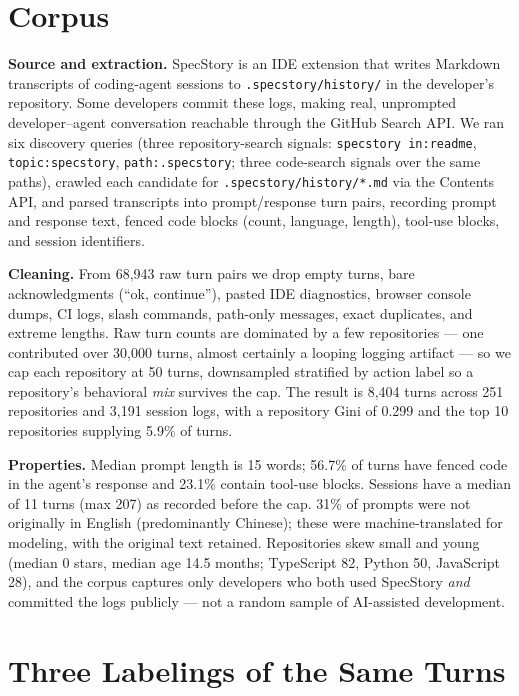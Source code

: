 \documentclass[10pt]{article}
\begin{document}
\section{Corpus}

\textbf{Source and extraction.} SpecStory is an IDE extension that writes
Markdown transcripts of coding-agent sessions to \texttt{.specstory/history/} in
the developer's repository. Some developers commit these logs, making real,
unprompted developer--agent conversation reachable through the GitHub Search API.
We ran six discovery queries (three repository-search signals: \texttt{specstory
in:readme}, \texttt{topic:specstory}, \texttt{path:.specstory}; three code-search
signals over the same paths), crawled each candidate for
\texttt{.specstory/history/*.md} via the Contents API, and parsed transcripts
into prompt/response turn pairs, recording prompt and response text, fenced code
blocks (count, language, length), tool-use blocks, and session identifiers.

\textbf{Cleaning.} From 68{,}943 raw turn pairs we drop empty turns, bare
acknowledgments (``ok, continue''), pasted IDE diagnostics, browser console
dumps, CI logs, slash commands, path-only messages, exact duplicates, and
extreme lengths. Raw turn counts are dominated by a few repositories --- one
contributed over 30{,}000 turns, almost certainly a looping logging artifact ---
so we cap each repository at 50 turns, downsampled stratified by action label so
a repository's behavioral \emph{mix} survives the cap. The result is 8{,}404
turns across 251 repositories and 3{,}191 session logs, with a repository Gini of
0.299 and the top 10 repositories supplying 5.9\% of turns.

\textbf{Properties.} Median prompt length is 15 words; 56.7\% of turns have
fenced code in the agent's response and 23.1\% contain tool-use blocks. Sessions
have a median of 11 turns (max 207) as recorded before the cap. 31\% of prompts
were not originally in English (predominantly Chinese); these were
machine-translated for modeling, with the original text retained. Repositories
skew small and young (median 0 stars, median age 14.5 months; TypeScript 82,
Python 50, JavaScript 28), and the corpus captures only developers who both used
SpecStory \emph{and} committed the logs publicly --- not a random sample of
AI-assisted development.

\section{Three Labelings of the Same Turns}
\end{document}
